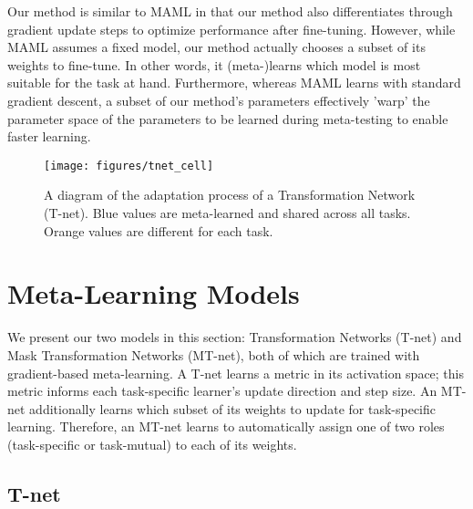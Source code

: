 \documentclass{article}
\newcommand{\0}{{\bf 0}}
\begin{document}
Our method is similar to MAML in that our method also differentiates through gradient update steps to optimize performance after fine-tuning.
However, while MAML assumes a fixed model, our method actually chooses a subset of its weights to fine-tune.
In other words, it (meta-)learns which model is most suitable for the task at hand.
Furthermore, whereas MAML learns with standard gradient descent, a subset of our method's parameters effectively 'warp' the parameter space of the parameters to be learned during meta-testing to enable faster learning.







\begin{figure}[ht!]
\centering\texttt{[image: figures/tnet\_cell]}
\caption{A diagram of the adaptation process of a Transformation Network (T-net).
Blue values are meta-learned and shared across all tasks. 
Orange values are different for each task.}
\end{figure}




\section{Meta-Learning Models}
\label{sec:main}

We present our two models in this section: Transformation Networks (T-net) and Mask Transformation Networks (MT-net),
 both of which are trained with gradient-based meta-learning.
A T-net learns a metric in its activation space;
this metric informs each task-specific learner's update direction and step size.
An MT-net additionally learns which subset of its weights to update for task-specific learning.
Therefore, an MT-net learns to automatically assign one of two roles (task-specific or task-mutual) to each of its weights.


\subsection{T-net}
\label{subsec:tnet}
\end{document}
